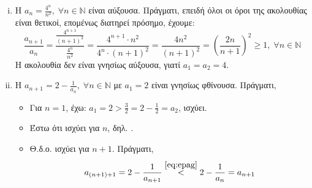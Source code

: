 \documentclass[main.tex]{subfiles}
\begin{document}
\begin{examples}
\begin{enumerate}[i)]
        \item Η $ a_{n}= \frac{4^{n}}{n^{2}}, \; \forall n \in \mathbb{N} $ 
            είναι αύξουσα. Πράγματι, επειδή όλοι οι όροι της ακολουθίας 
            είναι θετικοί, επομένως διατηρεί πρόσημο, έχουμε:
            \[
                \frac{a_{n+1}}{a_{n}} 
                = \frac{\frac{4^{n+1}}{(n+1)^{2}}}{\frac{4^{n}}{n^{2}}} 
                = \frac{4^{n+1}\cdot n^{2}}{4^{n}\cdot (n+1)^{2}} 
                = \frac{4n^{2}}{(n+1)^{2}}
                = \left( \frac{2n}{n+1} \right)^{2} \geq 1, 
                \; \forall n \in \mathbb{N} 
            \]
            Η ακολουθία δεν είναι γνησίως αύξουσα, γιατί $ 
            a_{1}= a_{2}=4$.

        \item Η $ a_{n+1}=2 - \frac{1}{a_{n}}, \; \forall n \in \mathbb{N}
            $ με $ a_{1} = 2 $ είναι γνησίως φθίνουσα. Πράγματι, 
            \begin{itemize}
                \item Για $ n=1 $, έχω: $ a_{1}= 2 >
                    \frac{3}{2} = 2 - \frac{1}{2} = a_{2}$, ισχύει.
                \item Έστω ότι ισχύει για $n$, δηλ.
                    .
                \item Θ.δ.ο. ισχύει για $ n+1 $. Πράγματι, 
                    \[
                        a_{(n+1)+1}=2- \frac{1}{a_{n+1}}
                        \overset{\eqref{eq:epag}}{<} 2 - 
                        \frac{1}{a_{n}} = a_{n+1}
                    \] 
            \end{itemize}
    \end{enumerate}
\end{examples}

\end{document}
